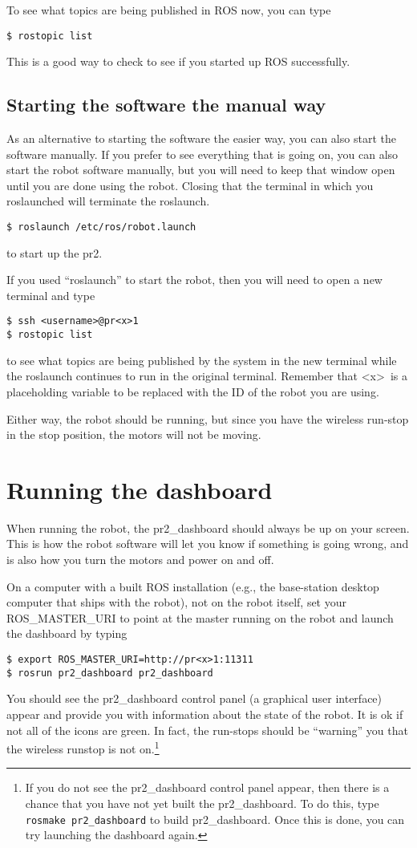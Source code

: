 To see what topics are being published in ROS now, you can type 
\begin{verbatim}
$ rostopic list
\end{verbatim}
This is a good way to check to see if you started up ROS successfully.

\subsection{Starting the software the manual way}
As an alternative to starting the software the easier way, you can also start the software manually. If you prefer to see everything that is going on, you can also start the robot software manually, but you will need to keep that 
window open until you are done using the robot. Closing that the terminal in which you roslaunched will terminate the roslaunch.
\begin{verbatim}
$ roslaunch /etc/ros/robot.launch
\end{verbatim}
to start up the pr2.  

If you used ``roslaunch'' to start the robot, then you will need to open a new terminal and type
\begin{verbatim}
$ ssh <username>@pr<x>1
$ rostopic list
\end{verbatim}
to see what topics are being published by the system in the new terminal while the roslaunch continues to run in the 
original terminal. Remember that \textless x\textgreater\ is a placeholding variable to be replaced with the ID of the robot you are using.

Either way, the robot should be running, but since you have the wireless run-stop in the stop position, the motors will not be moving.  

\section{Running the dashboard}
When running the robot, the pr2\_dashboard should always be up on your screen.  This is how the robot software will 
let you know if something is going wrong, and is also how you turn the motors and power on and off.  

On a computer with a built ROS installation (e.g., the base-station desktop computer that ships with the robot), not on the robot itself, set your ROS\_MASTER\_URI to point at the master running on the robot and launch the dashboard by typing
\begin{verbatim}
$ export ROS_MASTER_URI=http://pr<x>1:11311
$ rosrun pr2_dashboard pr2_dashboard
\end{verbatim}
You should see the pr2\_dashboard control panel (a graphical user interface) appear and provide you with information about the state of the robot. It is ok if not all of the icons are green. In fact, the run-stops should be ``warning'' you that the wireless runstop is not on.\footnote{If you do not see the pr2\_dashboard control panel appear, then there is a chance that you have not yet built the pr2\_dashboard. 
To do this, type \texttt{rosmake pr2\_dashboard} to build pr2\_dashboard. Once this is done, you can try launching the dashboard again.}

